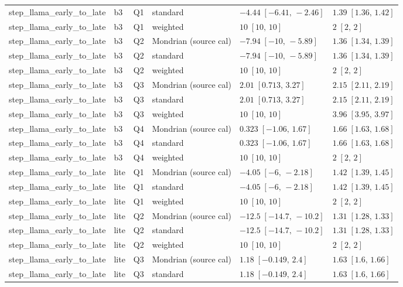 \begin{longtable}{@{}p{}p{}p{}p{}p{}p{}@{}}
step\_llama\_early\_to\_late & b3 & Q1 & standard & $-4.44\;[-6.41,\,-2.46]$ & $1.39\;[1.36,\,1.42]$ \\
step\_llama\_early\_to\_late & b3 & Q1 & weighted & $10\;[10,\,10]$ & $2\;[2,\,2]$ \\
step\_llama\_early\_to\_late & b3 & Q2 & Mondrian (source cal) & $-7.94\;[-10,\,-5.89]$ & $1.36\;[1.34,\,1.39]$ \\
step\_llama\_early\_to\_late & b3 & Q2 & standard & $-7.94\;[-10,\,-5.89]$ & $1.36\;[1.34,\,1.39]$ \\
step\_llama\_early\_to\_late & b3 & Q2 & weighted & $10\;[10,\,10]$ & $2\;[2,\,2]$ \\
step\_llama\_early\_to\_late & b3 & Q3 & Mondrian (source cal) & $2.01\;[0.713,\,3.27]$ & $2.15\;[2.11,\,2.19]$ \\
step\_llama\_early\_to\_late & b3 & Q3 & standard & $2.01\;[0.713,\,3.27]$ & $2.15\;[2.11,\,2.19]$ \\
step\_llama\_early\_to\_late & b3 & Q3 & weighted & $10\;[10,\,10]$ & $3.96\;[3.95,\,3.97]$ \\
step\_llama\_early\_to\_late & b3 & Q4 & Mondrian (source cal) & $0.323\;[-1.06,\,1.67]$ & $1.66\;[1.63,\,1.68]$ \\
step\_llama\_early\_to\_late & b3 & Q4 & standard & $0.323\;[-1.06,\,1.67]$ & $1.66\;[1.63,\,1.68]$ \\
step\_llama\_early\_to\_late & b3 & Q4 & weighted & $10\;[10,\,10]$ & $2\;[2,\,2]$ \\
step\_llama\_early\_to\_late & lite & Q1 & Mondrian (source cal) & $-4.05\;[-6,\,-2.18]$ & $1.42\;[1.39,\,1.45]$ \\
step\_llama\_early\_to\_late & lite & Q1 & standard & $-4.05\;[-6,\,-2.18]$ & $1.42\;[1.39,\,1.45]$ \\
step\_llama\_early\_to\_late & lite & Q1 & weighted & $10\;[10,\,10]$ & $2\;[2,\,2]$ \\
step\_llama\_early\_to\_late & lite & Q2 & Mondrian (source cal) & $-12.5\;[-14.7,\,-10.2]$ & $1.31\;[1.28,\,1.33]$ \\
step\_llama\_early\_to\_late & lite & Q2 & standard & $-12.5\;[-14.7,\,-10.2]$ & $1.31\;[1.28,\,1.33]$ \\
step\_llama\_early\_to\_late & lite & Q2 & weighted & $10\;[10,\,10]$ & $2\;[2,\,2]$ \\
step\_llama\_early\_to\_late & lite & Q3 & Mondrian (source cal) & $1.18\;[-0.149,\,2.4]$ & $1.63\;[1.6,\,1.66]$ \\
step\_llama\_early\_to\_late & lite & Q3 & standard & $1.18\;[-0.149,\,2.4]$ & $1.63\;[1.6,\,1.66]$ \\

\end{longtable}
